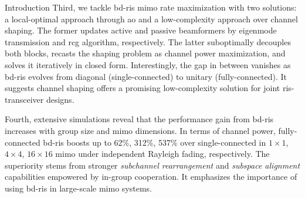 \documentclass[journal]{IEEEtran}
\begin{document}
\begin{section}{Introduction}
	Third, we tackle \gls{bd}-\gls{ris} \gls{mimo} rate maximization with two solutions: a local-optimal approach through \gls{ao} and a low-complexity approach over channel shaping.
	The former updates active and passive beamformers by eigenmode transmission and \gls{rcg} algorithm, respectively.
	The latter suboptimally decouples both blocks, recasts the shaping problem as channel power maximization, and solves it iteratively in closed form.
	Interestingly, the gap in between vanishes as \gls{bd}-\gls{ris} evolves from diagonal (single-connected) to unitary (fully-connected).
	It suggests channel shaping offers a promising low-complexity solution for joint \gls{ris}-transceiver designs.


	Fourth, extensive simulations reveal that the performance gain from \gls{bd}-\gls{ris} increases with group size and \gls{mimo} dimensions.
	In terms of channel power, fully-connected \gls{bd}-\gls{ris} boosts up to 62\%, 312\%, 537\% over single-connected in $1 \times 1$, $4 \times 4$, $16 \times 16$ \gls{mimo} under independent Rayleigh fading, respectively.
	The superiority stems from stronger \emph{subchannel rearrangement} and \emph{subspace alignment} capabilities empowered by in-group cooperation.
	It emphasizes the importance of using \gls{bd}-\gls{ris} in large-scale \gls{mimo} systems.



\end{section}
\end{document}
